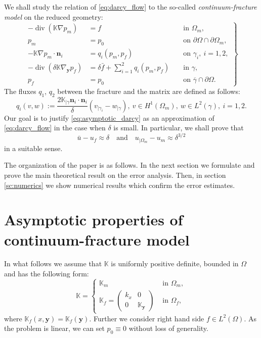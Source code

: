 \documentclass{llncs}
\def\vc#1{\mathbf{\boldsymbol{#1}}}     %
\def\tn#1{{\mathbb{#1}}}    %
\def\div{\operatorname{div}}
\def\yy{{\vc y}}
\begin{document}
We shall study the relation of \eqref{eq:darcy_flow} to the so-called \emph{continuum-fracture model} on the reduced geometry:
\begin{equation}
\label{eq:asymptotic_darcy}
\left.
\begin{aligned}
-\div(\tn K\nabla p_m) &= f &&\mbox{ in }\Omega_m,\\
p_m &= p_0 &&\mbox{ on }\partial\Omega\cap\partial\Omega_m,\\
-\tn K\nabla p_m\cdot\vc n_i &= q_i(p_m,p_f) &&\mbox{ on }\gamma_i,~i=1,2,\\
-\div(\delta\tn K\nabla_\yy p_f) &= \delta\bar f + \sum_{i=1}^2 q_i(p_m,p_f) &&\mbox{ in }\gamma,\\
p_f &= p_0 &&\mbox{ on }\overline\gamma\cap\partial\Omega.
\end{aligned}
\right\}
\end{equation}
The fluxes $q_1$, $q_2$ between the fracture and the matrix are defined as follows:
\[ q_i(v,w):=\frac{2\tn K_{|\gamma}\vc n_i\cdot\vc n_i}\delta (v_{|\gamma_i}-w_{|\gamma}), ~v\in H^1(\Omega_m),~w\in L^2(\gamma), ~i=1,2. \]
Our goal is to justify \eqref{eq:asymptotic_darcy} as an approximation of \eqref{eq:darcy_flow} in the case when $\delta$ is small.
In particular, we shall prove that
\[ \bar u - u_f \approx \delta\quad\mbox{and}\quad u_{|\Omega_m}-u_m \approx \delta^{3/2} \]
in a suitable sense.


The organization of the paper is as follows.
In the next section we formulate and prove the main theoretical result on the error analysis.
Then, in section \ref{sc:numerics} we show numerical results which confirm the error estimates.









\section{Asymptotic properties of continuum-fracture model}


In what follows we assume that $\tn K$ is uniformly positive definite, bounded in $\Omega$ and has the following form:
\[ \tn K = \begin{cases}\tn K_m & \mbox{ in }\Omega_m,\\ \tn K_f = \begin{pmatrix}k_x & 0\\0&\tn K_\yy\end{pmatrix} & \mbox{ in }\Omega_f,\end{cases} \]
where $\tn K_f(x,\yy)=\tn K_f(\yy)$.
Further we consider right hand side $f\in L^2(\Omega)$.
As the problem is linear, we can set $p_0\equiv 0$ without loss of generality.
\end{document}
